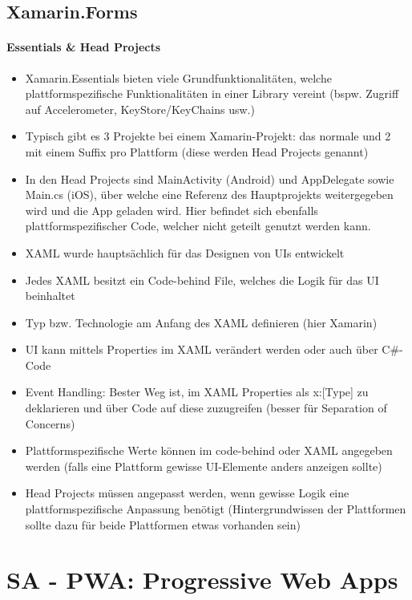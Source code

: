 \documentclass[a4paper]{article}
\begin{document}
		\subsection{Xamarin.Forms}
		
		\paragraph{Essentials \& Head Projects}
		\begin{itemize}
			\item Xamarin.Essentials bieten viele Grundfunktionalitäten, welche plattformspezifische Funktionalitäten in einer Library vereint (bspw. Zugriff auf Accelerometer, KeyStore/KeyChains usw.)
			\item Typisch gibt es 3 Projekte bei einem Xamarin-Projekt: das normale und 2 mit einem Suffix pro Plattform (diese werden Head Projects genannt)
			\item In den Head Projects sind MainActivity (Android) und AppDelegate sowie Main.cs (iOS), über welche eine Referenz des Hauptprojekts weitergegeben wird und die App geladen wird.
			Hier befindet sich ebenfalls plattformspezifischer Code, welcher nicht geteilt genutzt werden kann.
		\end{itemize}
	
		\vspace{1em}
		
		\begin{itemize}
			\item XAML wurde hauptsächlich für das Designen von UIs entwickelt
			\item Jedes XAML besitzt ein Code-behind File, welches die Logik für das UI beinhaltet
			\item Typ bzw. Technologie am Anfang des XAML definieren (hier Xamarin)
			\item UI kann mittels Properties im XAML verändert werden oder auch über C\#-Code
			\item Event Handling: Bester Weg ist, im XAML Properties als x:[Type] zu deklarieren und über Code auf diese zuzugreifen (besser für Separation of Concerns)
			\item Plattformspezifische Werte können im code-behind oder XAML angegeben werden (falls eine Plattform gewisse UI-Elemente anders anzeigen sollte)
			\item Head Projects müssen angepasst werden, wenn gewisse Logik eine plattformspezifische Anpassung benötigt (Hintergrundwissen der Plattformen sollte dazu für beide Plattformen etwas vorhanden sein)
		\end{itemize}
	
	\section{SA - PWA: Progressive Web Apps}
	\label{section:pwa}
	
	
\end{document}
